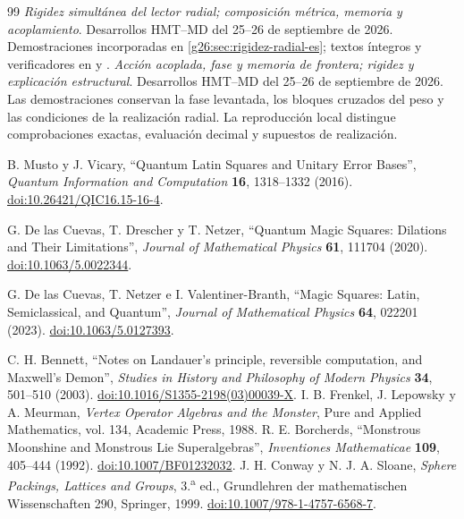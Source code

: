 \begin{thebibliography}{99}
 \emph{Rigidez simultánea del lector radial;
composición métrica, memoria y acoplamiento}. Desarrollos HMT--MD del
25--26 de septiembre de 2026. Demostraciones incorporadas en
\ref{g26:sec:rigidez-radial-es}; textos íntegros y verificadores en
 y
.
 \emph{Acción acoplada, fase y memoria de frontera;
rigidez y explicación estructural}. Desarrollos HMT--MD del
25--26 de septiembre de 2026. Las demostraciones conservan la fase
levantada, los bloques cruzados del peso y las condiciones de la
realización radial. La reproducción local distingue comprobaciones
exactas, evaluación decimal y supuestos de realización.
{}
 B. Musto y J. Vicary, ``Quantum Latin Squares and Unitary Error Bases'', \emph{Quantum Information and Computation} \textbf{16}, 1318--1332 (2016). \href{https://doi.org/10.26421/QIC16.15-16-4}{doi:10.26421/QIC16.15-16-4}.


 G. De las Cuevas, T. Drescher y T. Netzer, ``Quantum Magic Squares: Dilations and Their Limitations'', \emph{Journal of Mathematical Physics} \textbf{61}, 111704 (2020). \href{https://doi.org/10.1063/5.0022344}{doi:10.1063/5.0022344}.


 G. De las Cuevas, T. Netzer e I. Valentiner-Branth, ``Magic Squares: Latin, Semiclassical, and Quantum'', \emph{Journal of Mathematical Physics} \textbf{64}, 022201 (2023). \href{https://doi.org/10.1063/5.0127393}{doi:10.1063/5.0127393}.


 C. H. Bennett, ``Notes on Landauer's principle,
reversible computation, and Maxwell's Demon'', \emph{Studies in History
and Philosophy of Modern Physics} \textbf{34}, 501--510 (2003).
\href{https://doi.org/10.1016/S1355-2198(03)00039-X}{doi:10.1016/S1355-2198(03)00039-X}.
 I. B. Frenkel, J. Lepowsky y A. Meurman, \emph{Vertex Operator Algebras and the Monster}, Pure and Applied Mathematics, vol. 134, Academic Press, 1988.
 R. E. Borcherds, ``Monstrous Moonshine and Monstrous Lie Superalgebras'', \emph{Inventiones Mathematicae} \textbf{109}, 405--444 (1992). \href{https://doi.org/10.1007/BF01232032}{doi:10.1007/BF01232032}.
 J. H. Conway y N. J. A. Sloane, \emph{Sphere Packings, Lattices and Groups}, 3.\textsuperscript{a} ed., Grundlehren der mathematischen Wissenschaften 290, Springer, 1999. \href{https://doi.org/10.1007/978-1-4757-6568-7}{doi:10.1007/978-1-4757-6568-7}.


\end{thebibliography}
